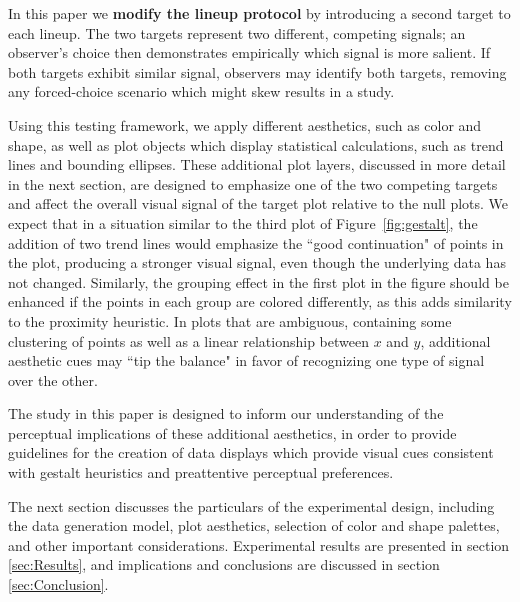 \documentclass[12pt]{article}\usepackage[]{graphicx}\usepackage[]{color}
\begin{document}
In this paper we {\bf modify the lineup protocol} by introducing a second target to each lineup. 
The two targets represent two different, competing signals; an observer's choice then demonstrates empirically which signal is more salient. 
If both targets exhibit similar signal, observers may identify both targets, removing any forced-choice scenario which might skew results in a study. 


Using this testing framework, we  apply different aesthetics, such as color and shape, as well as plot objects which display statistical calculations, such as trend lines and bounding ellipses. 
These additional plot layers, discussed in more detail in the next section, are designed to emphasize one of the two competing targets and affect the overall visual signal of the target plot relative to the null plots. 
We expect that in a situation similar to the third plot of Figure~\ref{fig:gestalt}, the addition of two trend lines would emphasize the ``good continuation" of points in the plot, producing a stronger visual signal, even though the underlying data has not changed. 
Similarly, the grouping effect in the first plot in the figure should be enhanced if the points in each group are colored differently, as this adds similarity to the proximity heuristic. 
In plots that are ambiguous, containing some clustering of points as well as a linear relationship between $x$ and $y$, additional aesthetic cues may ``tip the balance" in favor of recognizing one type of signal over the other.

The study in this paper is designed to inform our understanding of the perceptual implications of these additional aesthetics, in order to provide guidelines for the creation of data displays which provide visual cues consistent with gestalt heuristics and preattentive perceptual preferences. 

The next section discusses the particulars of the experimental design, including the data generation model, plot aesthetics, selection of color and shape palettes, and other important considerations. 
Experimental results are presented in section \ref{sec:Results}, and implications and conclusions are discussed in section \ref{sec:Conclusion}. 
\end{document}
